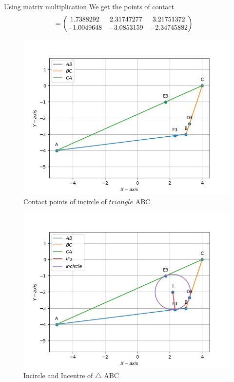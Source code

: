 \documentclass[10pt]{book}
\begin{document}
\begin{enumerate}[label=\thesubsection.\arabic*.,ref=\thesubsection.\theenumi]
Using matrix multiplication We get the points of contact 
\begin{align}
    &= \begin{pmatrix} 1.7388292 & 2.31747277 & 3.21751372 \\ -1.0049648 & -3.0853159 & -2.34745882\end{pmatrix}
\end{align}
\begin{figure}[H]
    \centering
   \includegraphics{figs/D3E3F3.png}
    \caption{Contact points of incircle of $triangle$ ABC}
    \label{fig:mat_ang1}
\end{figure}
\begin{figure}[H]
    \centering
    \includegraphics{figs/Incircle.png}
    \caption{Incircle and Incentre of $\triangle$ ABC }
    \label{fig:mat_ang2}
\end{figure}
\end{enumerate}
\end{document}
